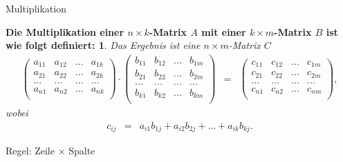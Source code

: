 \documentclass[german]{beamer}
\newcommand{\bq}{\begin{eqnarray*}}
\newcommand{\eq}{\end{eqnarray*}}
\newtheorem*{mytheorem12}{Die Multiplikation einer $n\times k$-Matrix $A$ mit einer $k \times m$-Matrix $B$ ist wie folgt definiert:}
\begin{document}
\begin{frame}{Multiplikation}

\begin{mytheorem12}
Das Ergebnis ist eine $n \times m$-Matrix $C$
{\footnotesize
\bq
\left( \begin{array}{cccc}
 a_{11} & a_{12} & ... & a_{1k} \\
 a_{21} & a_{22} & ... & a_{2k} \\
 ...    & ...    & ... & ...    \\
 a_{n1} & a_{n2} & ... & a_{nk} \\
\end{array} \right)
 \cdot
\left( \begin{array}{cccc}
 b_{11} & b_{12} & ... & b_{1m} \\
 b_{21} & b_{22} & ... & b_{2m} \\
 ...    & ...    & ... & ...    \\
 b_{k1} & b_{k2} & ... & b_{km} \\
\end{array} \right)
& = &
\left( \begin{array}{cccc}
 c_{11} & c_{12} & ... & c_{1m} \\
 c_{21} & c_{22} & ... & c_{2m} \\
 ...    & ...    & ... & ...    \\
 c_{n1} & c_{n2} & ... & c_{nm} \\
\end{array} \right),
\eq
}
wobei
\bq
 c_{ij} & = & a_{i1} b_{1j} + a_{i2} b_{2j} + ... + a_{ik} b_{kj}.
\eq
\end{mytheorem12}

\vspace*{2mm}
Regel: \hspace*{17mm} Zeile $\times$ Spalte

\end{frame}
\end{document}
